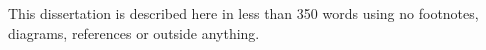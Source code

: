 
This dissertation is described here in less than 350 words using no
footnotes, diagrams, references or outside anything.
